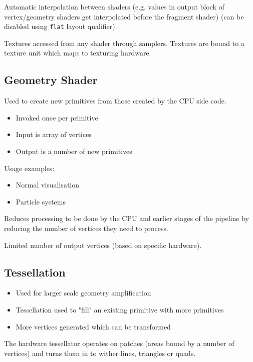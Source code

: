\documentclass[a4paper]{article}
\begin{document}
Automatic interpolation between shaders (e.g. values in output block of
vertex/geometry shaders get interpolated before the fragment shader) (can be
disabled using \texttt{flat} layout qualifier).

Textures accessed from any shader through samplers. Textures are bound to a
texture unit which maps to texturing hardware.

\subsection{Geometry Shader}

Used to create new primitives from those created by the CPU side code.

\begin{itemize}
  \item Invoked once per primitive
  \item Input is array of vertices
  \item Output is a number of new primitives
\end{itemize}

Usage examples:

\begin{itemize}
  \item Normal visualisation
  \item Particle systems
\end{itemize}

Reduces processing to be done by the CPU and earlier stages of the pipeline by
reducing the number of vertices they need to process.

Limited number of output vertices (based on specific hardware).

\subsection{Tessellation}

\begin{itemize}
  \item Used for larger scale geometry amplification
  \item Tessellation used to "fill" an existing primitive with more primitives
  \item More vertices generated which can be transformed
\end{itemize}

The hardware tessellator operates on patches (areas bound by a number of
vertices) and turns them in to wither lines, triangles or quads.
\end{document}
